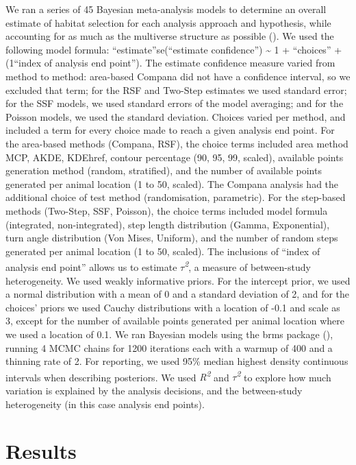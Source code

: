 \documentclass[10pt,a4paper]{article}
\begin{document}
We ran a series of 45 Bayesian meta-analysis models to determine an overall estimate of habitat selection for each analysis approach and hypothesis, while accounting for as much as the multiverse structure as possible ().
We used the following model formula: ``estimate''\textbar se(``estimate confidence'') \textasciitilde{} 1 + ``choices'' + (1\textbar{}``index of analysis end point'').
The estimate confidence measure varied from method to method: area-based Compana did not have a confidence interval, so we excluded that term; for the RSF and Two-Step estimates we used standard error; for the SSF models, we used standard errors of the model averaging; and for the Poisson models, we used the standard deviation.
Choices varied per method, and included a term for every choice made to reach a given analysis end point.
For the area-based methods (Compana, RSF), the choice terms included area method MCP, AKDE, KDEhref, contour percentage (90, 95, 99, scaled), available points generation method (random, stratified), and the number of available points generated per animal location (1 to 50, scaled).
The Compana analysis had the additional choice of test method (randomisation, parametric).
For the step-based methods (Two-Step, SSF, Poisson), the choice terms included model formula (integrated, non-integrated), step length distribution (Gamma, Exponential), turn angle distribution (Von Mises, Uniform), and the number of random steps generated per animal location (1 to 50, scaled).
The inclusions of ``index of analysis end point'' allows us to estimate \emph{\(\tau\)\textsuperscript{2}}, a measure of between-study heterogeneity.
We used weakly informative priors.
For the intercept prior, we used a normal distribution with a mean of 0 and a standard deviation of 2, and for the choices' priors we used Cauchy distributions with a location of -0.1 and scale as 3, except for the number of available points generated per animal location where we used a location of 0.1.
We ran Bayesian models using the brms package (), running 4 MCMC chains for 1200 iterations each with a warmup of 400 and a thinning rate of 2.
For reporting, we used 95\% median highest density continuous intervals when describing posteriors.
We used \emph{R\textsuperscript{2}} and \emph{\(\tau\)\textsuperscript{2}} to explore how much variation is explained by the analysis decisions, and the between-study heterogeneity (in this case analysis end points).

\section{Results}\label{results}
\end{document}
